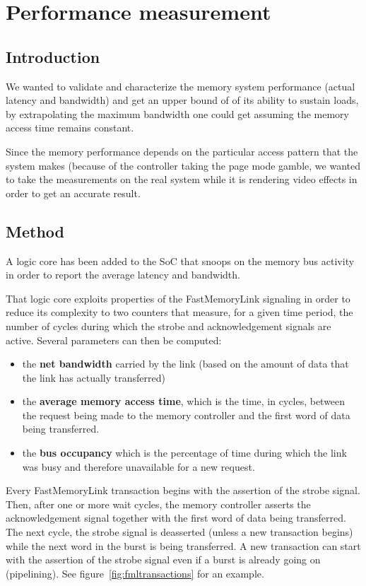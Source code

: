 \documentclass[a4paper,11pt]{kthesis}
\begin{document}
\section{Performance measurement}
\label{sec:memperf}
\subsection{Introduction}
We wanted to validate and characterize the memory system performance (actual latency and bandwidth) and get an upper bound of of its ability to sustain loads, by extrapolating the maximum bandwidth one could get assuming the memory access time remains constant.

Since the memory performance depends on the particular access pattern that the system makes (because of the controller taking the page mode gamble, we wanted to take the measurements on the real system while it is rendering video effects in order to get an accurate result.

\subsection{Method}
A logic core has been added to the SoC that snoops on the memory bus activity in order to report the average latency and bandwidth.

That logic core exploits properties of the FastMemoryLink signaling in order to reduce its complexity to two counters that measure, for a given time period, the number of cycles during which the strobe and acknowledgement signals are active. Several parameters can then be computed:
\begin{itemize}
\item the \textbf{net bandwidth} carried by the link (based on the amount of data that the link has actually transferred)
\item the \textbf{average memory access time}, which is the time, in cycles, between the request being made to the memory controller and the first word of data being transferred.
\item the \textbf{bus occupancy} which is the percentage of time during which the link was busy and therefore unavailable for a new request.
\end{itemize}

Every FastMemoryLink transaction begins with the assertion of the strobe signal. Then, after one or more wait cycles, the memory controller asserts the acknowledgement signal together with the first word of data being transferred. The next cycle, the strobe signal is deasserted (unless a new transaction begins) while the next word in the burst is being transferred. A new transaction can start with the assertion of the strobe signal even if a burst is already going on (pipelining). See figure~\ref{fig:fmltransactions} for an example.
\end{document}
